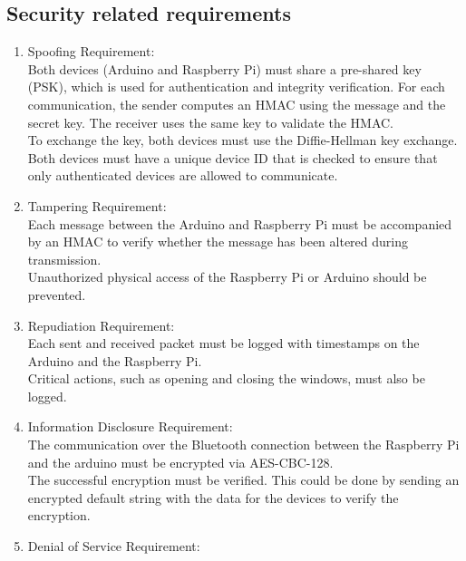 \subsection{Security related requirements}
    \begin{enumerate}[label*=\arabic*.]
        \item \label{sreq.1} Spoofing Requirement:  \\
        Both devices (Arduino and Raspberry Pi) must share a pre-shared key (PSK), which is used for authentication and integrity verification. For each communication, the sender computes an HMAC using the message and the secret key. The receiver uses the same key to validate the HMAC. \\ 
        To exchange the key, both devices must use the Diffie-Hellman key exchange.\\
        Both devices must have a unique device ID that is checked to ensure that only authenticated devices are allowed to communicate.\\
        \item \label{sreq.2} Tampering Requirement:  \\
        Each message between the Arduino and Raspberry Pi must be accompanied by an HMAC to verify whether the message has been altered during transmission. \\ 
        Unauthorized physical access of the Raspberry Pi or Arduino should be prevented.\\
        \item \label{sreq.3} Repudiation Requirement:  \\
        Each sent and received packet must be logged with timestamps on the Arduino and the Raspberry Pi. \\ 
        Critical actions, such as opening and closing the windows, must also be logged.\\
        \item \label{sreq.4} Information Disclosure Requirement:  \\
        The communication over the Bluetooth connection between the Raspberry Pi and the arduino must be encrypted via AES-CBC-128. \\
        The successful encryption must be verified. This could be done by sending an encrypted default string with the data for the devices to verify the encryption.\\
        \item \label{sreq.5} Denial of Service Requirement:  \\

\end{enumerate}
